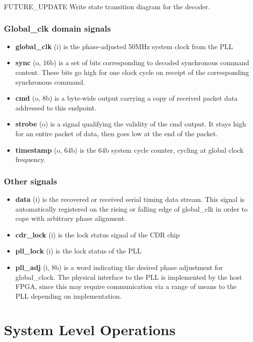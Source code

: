 \documentclass[a4paper,11pt]{article}
\begin{document}
{\color{red}FUTURE\_UPDATE} Write state transition diagram for the decoder.

\subsubsection{Global\_clk domain signals}

\begin{itemize}
	\item {\bf global\_clk} (i) is the phase-adjusted 50MHz system clock from the PLL
	\item {\bf sync} (o, 16b) is a set of bits corresponding to decoded synchronous command content. These bits go high for one clock cycle on receipt of the corresponding synchronous command.
	\item {\bf cmd} (o, 8b) is a byte-wide output carrying a copy of received packet data addressed to this endpoint.
	\item {\bf strobe} (o) is a signal qualifying the validity of the cmd output. It stays high for an entire packet of data, then goes low at the end of the packet.
	\item {\bf timestamp} (o, 64b) is the 64b system cycle counter, cycling at global clock frequency.
\end{itemize}

\subsubsection{Other signals}

\begin{itemize}
	\item {\bf data} (i) is the recovered or received serial timing data stream. This signal is automatically registered on the rising or falling edge of global\_clk in order to cope with arbitrary phase alignment.
	\item {\bf cdr\_lock} (i) is the lock status signal of the CDR chip
	\item {\bf pll\_lock} (i) is the lock status of the PLL
	\item {\bf pll\_adj} (i, 8b) is a word indicating the desired phase adjustment for global\_clock. The physical interface to the PLL is implemented by the host FPGA, since this may require communication via a range of means to the PLL depending on implementation.
\end{itemize}

\section{System Level Operations}
\end{document}
